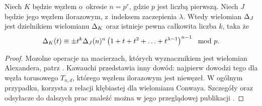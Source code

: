 \begin{proposition}
%
\label{prp:murasugi_periodic}%
    Niech $K$ będzie węzłem o~okresie $n = p^r$, gdzie $p$ jest liczbą pierwszą.
    Niech $J$ będzie jego węzłem ilorazowym, z~indeksem zaczepienia $\lambda$.
    Wtedy wielomian $\Delta_J$ jest dzielnikiem wielomianu $\Delta_K$ oraz istnieje pewna całkowita liczba $k$, taka że
    \begin{equation}
        \Delta_K(t) \equiv \pm t^k \Delta_J(n)^n \left(1 + t + t^2 + \ldots + t^{\lambda - 1}\right)^{n-1} \mod p.
    \end{equation}
\end{proposition}

\begin{proof}
    Mozolne operacje na macierzach, których wyznacznikiem jest wielomian Alexandera, patrz \cite{murasugi71}.
    Kawauchi przedstawia inny dowód: najpierw dowodzi tego dla węzła torusowego $T_{n, d}$, którego węzłem ilorazowym jest niewęzeł.
    W ogólnym przypadku, korzysta z relacji kłębiastej dla wielomianu Conwaya.
    Szczegóły oraz odsyłacze do dalszych prac znaleźć można w jego przeglądowej publikacji \cite[s. 122-124]{kawauchi96}.
\end{proof}

%

